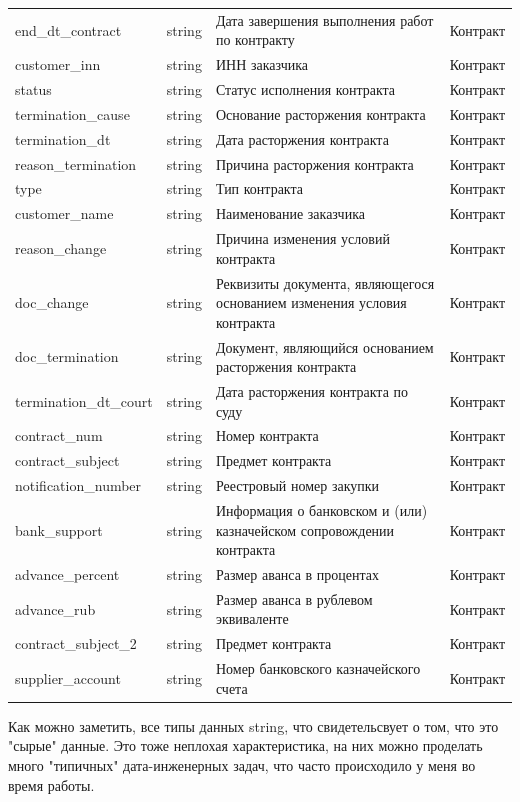 \documentclass[12pt,letterpaper, onecolumn]{exam}
\begin{document}
\begin{longtable}{|p{4.5cm}|p{2cm}|p{8cm}|p{2cm}|}
end\_dt\_contract & string & Дата завершения выполнения работ по контракту & Контракт \\
customer\_inn & string & ИНН заказчика & Контракт \\
status & string & Статус исполнения контракта & Контракт \\
termination\_cause & string & Основание расторжения контракта & Контракт \\
termination\_dt & string & Дата расторжения контракта & Контракт \\
reason\_termination & string & Причина расторжения контракта & Контракт \\
type & string & Тип контракта & Контракт \\
customer\_name & string & Наименование заказчика & Контракт \\
reason\_change & string & Причина изменения условий контракта & Контракт \\
doc\_change & string & Реквизиты документа, являющегося основанием изменения условия контракта & Контракт \\
doc\_termination & string & Документ, являющийся основанием расторжения контракта & Контракт \\
termination\_dt\_court & string & Дата расторжения контракта по суду & Контракт \\
contract\_num & string & Номер контракта & Контракт \\
contract\_subject & string & Предмет контракта & Контракт \\
notification\_number & string & Реестровый номер закупки & Контракт \\
bank\_support & string & Информация о банковском и (или) казначейском сопровождении контракта & Контракт \\
advance\_percent & string & Размер аванса в процентах & Контракт \\
advance\_rub & string & Размер аванса в рублевом эквиваленте & Контракт \\
contract\_subject\_2 & string & Предмет контракта & Контракт \\
supplier\_account & string & Номер банковского казначейского счета & Контракт \\
\hline
\end{longtable}

Как можно заметить, все типы данных string, что свидетельсвует о том, что это "сырые" данные. Это тоже неплохая характеристика, на них можно проделать много "типичных" дата-инженерных задач, что часто происходило у меня во время работы.
\end{document}
